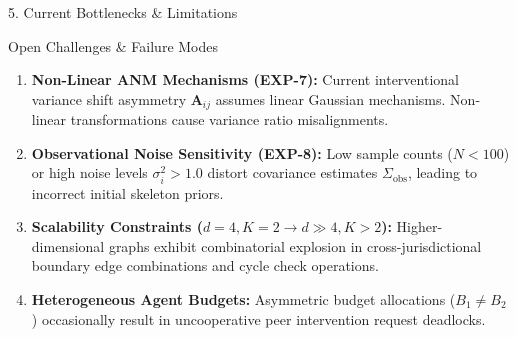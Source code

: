 \documentclass[aspectratio=169, 10pt]{beamer}
\begin{document}
\begin{frame}{5. Current Bottlenecks \& Limitations}
  \begin{alertblock}{Open Challenges \& Failure Modes}
    \begin{enumerate}
      \item \textbf{Non-Linear ANM Mechanisms (EXP-7):} Current interventional variance shift asymmetry $\mathbf{A}_{ij}$ assumes linear Gaussian mechanisms. Non-linear transformations cause variance ratio misalignments.
      \item \textbf{Observational Noise Sensitivity (EXP-8):} Low sample counts ($N < 100$) or high noise levels $\sigma_i^2 > 1.0$ distort covariance estimates $\Sigma_{\text{obs}}$, leading to incorrect initial skeleton priors.
      \item \textbf{Scalability Constraints ($d=4, K=2 \to d \gg 4, K > 2$):} Higher-dimensional graphs exhibit combinatorial explosion in cross-jurisdictional boundary edge combinations and cycle check operations.
      \item \textbf{Heterogeneous Agent Budgets:} Asymmetric budget allocations ($B_1 \neq B_2$) occasionally result in uncooperative peer intervention request deadlocks.
    \end{enumerate}
  \end{alertblock}
\end{frame}
\end{document}
